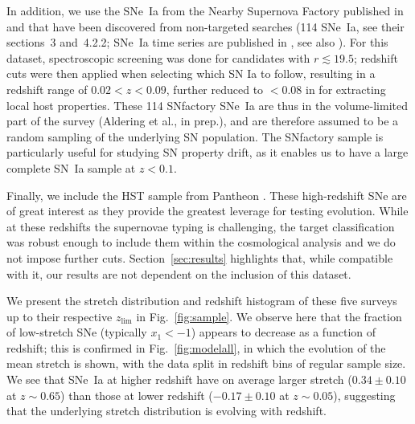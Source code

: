 \documentclass[]{aa}
\begin{document}
In addition, we use the SNe~Ia from the Nearby Supernova Factory
\citep[SNfactory,][]{aldering2002} published in \cite{rigault2020} and that have
been discovered from non-targeted searches (114 SNe~Ia, see their sections~3
and~4.2.2; SNe~Ia time series are published in \citealt{saunders2020}, see also
\citealt{aldering2020}). For this dataset, spectroscopic screening was
    done for candidates with $r \lesssim 19.5$; redshift cuts were then applied
    when selecting which SN Ia to follow, resulting in a redshift range of $0.02
< z < 0.09$, further reduced to $<0.08$ in \cite{rigault2020} for extracting
local host properties. These 114 SNfactory SNe~Ia are thus in the
volume-limited part of the survey (Aldering et al., in prep.), and are therefore
assumed to be a random sampling of the underlying SN population. The SNfactory
sample is particularly useful for studying SN property drift, as it enables us
to have a large complete SN~Ia sample at $z<0.1$. 

Finally, we include the HST sample from Pantheon \citep{strolger04}.
These high-redshift SNe are of great interest as they provide the
    greatest leverage for testing evolution. While at these redshifts the
    supernovae typing is challenging, the target classification was robust
    enough to include them within the cosmological analysis \citep{scolnic2018a}
    and we do not impose further cuts. Section~\ref{sec:results} highlights
    that, while compatible with it, our results are not dependent on the
    inclusion of this dataset.

We present the stretch distribution and redshift histogram of these five surveys
up to their respective $z_{\lim}$ in Fig.~\ref{fig:sample}. We observe here
that the fraction of low-stretch SNe (typically $x_1 < -1$) appears to decrease as
a function of redshift; this is confirmed in Fig.~\ref{fig:modelall}, in which
the evolution of the mean stretch is shown, with the data split in
redshift bins of regular sample size. We see that SNe~Ia at higher redshift have
on average larger stretch ($0.34 \pm 0.10$ at $z\sim0.65$) than those at lower
redshift ($-0.17\pm 0.10$ at $z\sim0.05$), suggesting that the underlying
stretch distribution is evolving with redshift.
\end{document}
